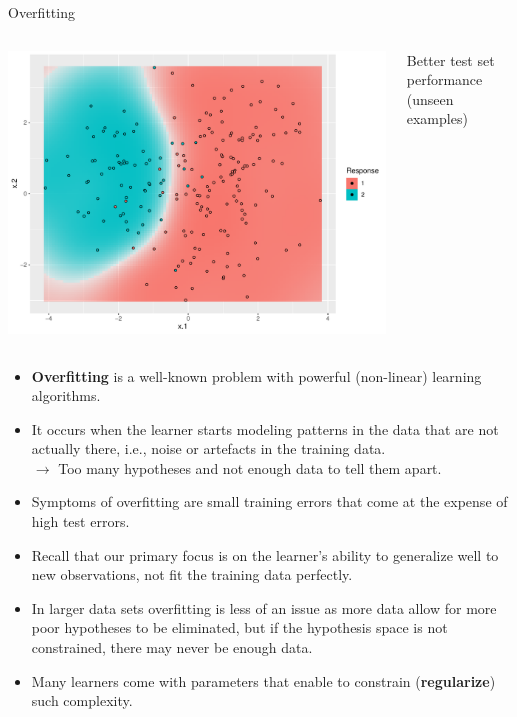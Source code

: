 \documentclass[11pt,compress,t,notes=noshow, xcolor=table]{beamer}
\newenvironment{knitrout}{}{} %
\begin{document}
\begin{vbframe}{Overfitting}
\begin{columns}[T,onlytextwidth]
\begin{knitrout}
{\centering \includegraphics[width=\textwidth]{figure/eval_ofit_2} 
}

\end{knitrout}
Better test set performance (unseen examples)
\end{columns}

\framebreak

\begin{itemize}
  \item \textbf{Overfitting} is a well-known problem with powerful 
  (non-linear) learning algorithms.
  \item It occurs when the learner starts modeling patterns in the data 
  that are not actually there, i.e., noise or artefacts in the training data. \\
  $\rightarrow$ Too many hypotheses and not enough data to tell them apart.
  \item Symptoms of overfitting are small training errors that come at the 
  expense of high test errors.
  \item Recall that our primary focus is on the learner's ability to generalize 
  well to new observations, not fit the training data perfectly.
  \item In larger data sets overfitting is less of an issue as more data allow 
  for more poor hypotheses to be eliminated, but if the hypothesis space is not 
  constrained, there may never be enough data.
  \item Many learners come with parameters that enable to constrain 
  (\textbf{regularize}) such complexity.
\end{itemize}

\end{vbframe}
\end{document}
